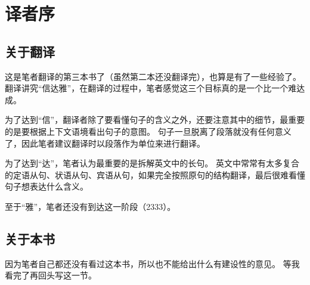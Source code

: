 \chapter*{译者序}

\section*{关于翻译}

这是笔者翻译的第三本书了（虽然第二本还没翻译完），也算是有了一些经验了。
翻译讲究“信达雅”，在翻译的过程中，笔者感觉这三个目标真的是一个比一个难达成。

为了达到“信”，翻译者除了要看懂句子的含义之外，还要注意其中的细节，最重要的是要根据上下文语境看出句子的意图。
句子一旦脱离了段落就没有任何意义了，因此笔者建议翻译时以段落作为单位来进行翻译。

为了达到“达”，笔者认为最重要的是拆解英文中的长句。
英文中常常有太多复合的定语从句、状语从句、宾语从句，如果完全按照原句的结构翻译，最后很难看懂句子想表达什么含义。

至于“雅”，笔者还没有到达这一阶段（2333）。

\section*{关于本书}

因为笔者自己都还没有看过这本书，所以也不能给出什么有建设性的意见。
等我看完了再回头写这一节。
